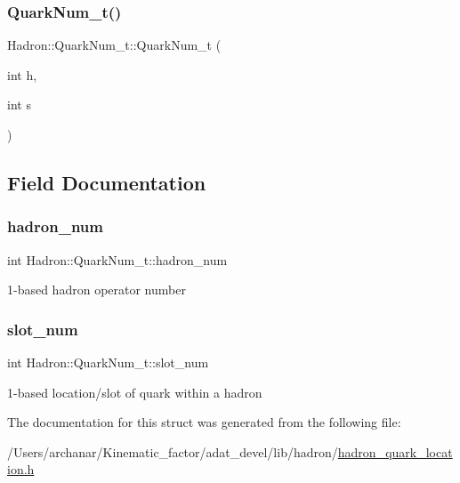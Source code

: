 \mbox{\label{structHadron_1_1QuarkNum__t_a7a990500f4d5bded0bfb10c0e9096263}} 
\subsubsection{\texorpdfstring{QuarkNum\_t()}{QuarkNum\_t()}\hspace{0.1cm}{\footnotesize\ttfamily [4/4]}}
{\footnotesize\ttfamily Hadron\+::\+Quark\+Num\+\_\+t\+::\+Quark\+Num\+\_\+t (\begin{DoxyParamCaption}\item[{int}]{h,  }\item[{int}]{s }\end{DoxyParamCaption})\hspace{0.3cm}{\ttfamily [inline]}}



\subsection{Field Documentation}
\mbox{\label{structHadron_1_1QuarkNum__t_a837a30c976c28b1b6d7c597e755b5900}} 
\subsubsection{\texorpdfstring{hadron\_num}{hadron\_num}}
{\footnotesize\ttfamily int Hadron\+::\+Quark\+Num\+\_\+t\+::hadron\+\_\+num}

1-\/based hadron operator number \mbox{\label{structHadron_1_1QuarkNum__t_a6d0d3b601e76b87d83358c5fda8a58b8}} 
\subsubsection{\texorpdfstring{slot\_num}{slot\_num}}
{\footnotesize\ttfamily int Hadron\+::\+Quark\+Num\+\_\+t\+::slot\+\_\+num}

1-\/based location/slot of quark within a hadron 

The documentation for this struct was generated from the following file\+:\begin{DoxyCompactItemize}
\item 
/\+Users/archanar/\+Kinematic\+\_\+factor/adat\+\_\+devel/lib/hadron/\mbox{\hyperlink{lib_2hadron_2hadron__quark__location_8h}{hadron\+\_\+quark\+\_\+location.\+h}}\end{DoxyCompactItemize}
